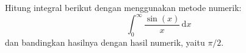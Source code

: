 \documentclass[12pt]{article}
\begin{document}
\thispagestyle{empty}

Hitung integral berikut dengan menggunakan metode numerik:
$$
\int_{0}^{\infty} \frac{\sin(x)}{x}\,\mathrm{d}x
$$
dan bandingkan hasilnya dengan hasil numerik, yaitu $\pi/2$.
\end{document}
